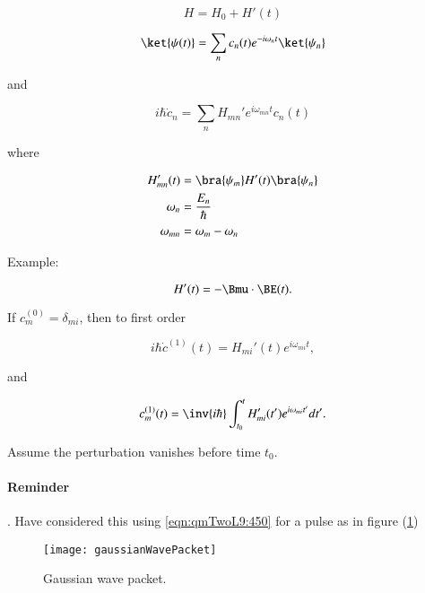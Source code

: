 \begin{equation}\label{eqn:qmTwoL9:330}
H = H_0 + H'(t)
\end{equation}

\begin{equation}\label{eqn:qmTwoL9:350}
\ket{\psi(t)} = \sum_n c_n(t) e^{-i\omega_n t} \ket{\psi_n}
\end{equation}

and 

\begin{equation}\label{eqn:qmTwoL9:370}
i \hbar \dot{c}_n = \sum_n H_{mn}' e^{i \omega_{mn} t} c_n(t)
\end{equation}

where

\begin{align}\label{eqn:qmTwoL9:390}
H_{mn}'(t) &= \bra{\psi_m} H'(t) \bra{\psi_n} \\
\omega_n &= \frac{E_n}{\hbar} \\
\omega_{mn} &= \omega_m - \omega_n
\end{align}

Example:

\begin{equation}\label{eqn:qmTwoL9:410}
H'(t) = - \Bmu \cdot \BE(t).
\end{equation}

If $c_m^{(0)} = \delta_{mi}$, then to first order

\begin{equation}\label{eqn:qmTwoL9:430}
i \hbar \dot{c}^{(1)}(t) = H_{mi}'(t) e^{i \omega_{mi} t},
\end{equation}

and

\begin{equation}\label{eqn:qmTwoL9:450}
c_m^{(1)}(t) = \inv{i\hbar} \int_{t_0}^t H_{mi}'(t') e^{i \omega_{mi} t'} dt'.
\end{equation}

Assume the perturbation vanishes before time $t_0$.

\paragraph{Reminder}.  Have considered this using \ref{eqn:qmTwoL9:450} for a pulse as in figure (\ref{fig:gaussianWavePacket})

\begin{figure}[htp]
\centering
\texttt{[image: gaussianWavePacket]}
\caption{Gaussian wave packet.}\label{fig:gaussianWavePacket}
\end{figure}

